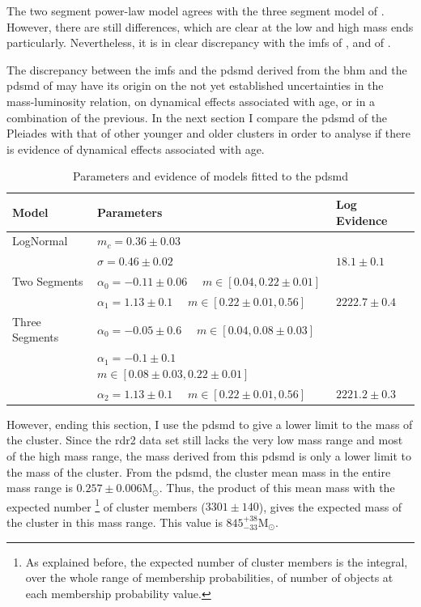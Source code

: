 The two segment power-law model agrees with the three segment model of \citet{Bouy2015}. However, there are still differences, which are clear at the low and high mass ends particularly. Nevertheless, it is in clear discrepancy with the \glspl{imf} of \citet{Chabrier2005},  \cite[$m_c=0.25_{-0.016}^{+0.021}$ and $\sigma=0.55_{-0.01}^{+0.05}$, the uncertainties are those reported by][for single objects]{Chabrier2003b} and of \citet{Thies2007}. 

The discrepancy between the \glspl{imf} and the \gls{pdsmd} derived from the \gls{bhm} and the \gls{pdsmd} of \citet{Bouy2015} may have its origin on the not yet established uncertainties in the mass-luminosity relation, on dynamical effects associated with age, or in a combination of the previous. In the next section I compare the \gls{pdsmd} of the Pleiades with that of other younger and older clusters in order to analyse if there is evidence of dynamical effects associated with age.

\begin{table}[ht!]
\caption{Parameters and evidence of models fitted to the \gls{pdsmd}}
\begin{center}
\begin{tabular}{lll}
Model&Parameters& Log Evidence\\
\hline
LogNormal&$m_c=0.36\pm0.03$&\\
                 &$\sigma=0.46\pm0.02$ & $18.1 \pm 0.1$\\
\hline
Two Segments &$\alpha_0=-0.11\pm0.06$ \ \ $m \in [0.04,0.22\pm0.01]$ & \\ 
&  $\alpha_1=1.13\pm0.1$ \ \ $m \in [0.22\pm0.01,0.56]$&$2222.7\pm0.4$\\
\hline
Three Segments &$\alpha_0=-0.05\pm0.6$ \ \ $m \in [0.04,0.08\pm0.03]$ & \\
                          &$\alpha_1=-0.1\pm0.1$ \ \ $m \in [0.08\pm0.03,0.22\pm0.01]$ & \\ 
                          &$\alpha_2=1.13\pm0.1$ \ \ $m \in [0.22\pm0.01,0.56]$&$2221.2\pm 0.3$\\
\hline
\end{tabular}
\end{center}
\label{tab:fitPDSMD}
\end{table}%

However, ending this section, I use the \gls{pdsmd} to give a lower limit to the mass of the cluster. Since the \gls{rdr2} data set  still lacks the very low mass range and most of the high mass range, the mass derived from this \gls{pdsmd} is only a lower limit to the mass of the cluster. From the \gls{pdsmd}, the cluster mean mass in the entire mass range is $0.257 \pm 0.006 \mathrm{M_{\odot}}$. Thus, the product of this mean mass with the expected number \footnote{As explained before, the expected number of cluster members is the integral, over the whole range of membership probabilities, of number of objects at each membership probability value.} of cluster members ($3301 \pm 140$), gives the expected mass of the cluster in this mass range. This  value is $845^{+38}_{-33} \mathrm{M_{\odot}}$. 

